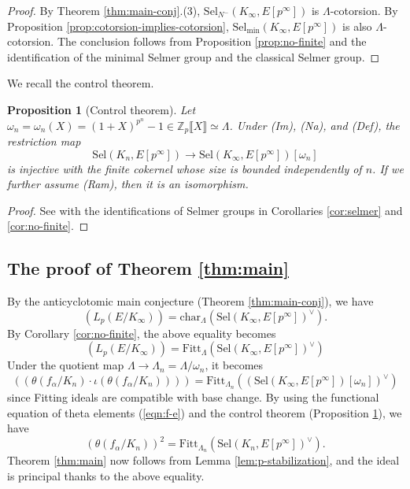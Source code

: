 \documentclass[11pt]{amsart}
\numberwithin{equation}{section}
\newtheorem{prop}[thm]{Proposition}
\theoremstyle{definition}
\begin{document}
\begin{proof}
By Theorem \ref{thm:main-conj}.(3), $\mathrm{Sel}_{N^-}(K_\infty, E[p^\infty])$ is $\Lambda$-cotorsion.
By Proposition \ref{prop:cotorsion-implies-cotorsion},  $\mathrm{Sel}_{\mathrm{min}}(K_\infty, E[p^\infty])$ is also $\Lambda$-cotorsion.
The conclusion follows from Proposition \ref{prop:no-finite} and the identification of the minimal Selmer group and the classical Selmer group.
\end{proof}
We recall the control theorem.
\begin{prop}[Control theorem] \label{prop:control}
Let $\omega_n = \omega_n(X) = (1+X)^{p^n} -1 \in \mathbb{Z}_p\llbracket X \rrbracket \simeq \Lambda$.  %
Under (Im), (Na), and (Def), the restriction map
$$\mathrm{Sel}(K_n, E[p^\infty]) \to \mathrm{Sel}(K_\infty, E[p^\infty])[\omega_n] $$
is injective with the finite cokernel whose size is bounded independently of $n$. If we further assume (Ram),
then it is an isomorphism.
\end{prop}
\begin{proof}
See \cite[Prop. 1.9]{chida-hsieh-main-conj} with the identifications of Selmer groups in Corollaries \ref{cor:selmer} and \ref{cor:no-finite}.
\end{proof}

\subsection{The proof of Theorem \ref{thm:main}}
By the anticyclotomic main conjecture (Theorem \ref{thm:main-conj}), we have
$$\left( L_p(E/K_\infty) \right) = \mathrm{char}_{\Lambda} \left( \mathrm{Sel}(K_\infty, E[p^\infty])^\vee \right) .$$
By Corollary \ref{cor:no-finite}, the above equality becomes
$$\left( L_p(E/K_\infty) \right) = \mathrm{Fitt}_{\Lambda} \left( \mathrm{Sel}(K_\infty, E[p^\infty])^\vee \right)$$
Under the quotient map $\Lambda \to \Lambda_n = \Lambda / \omega_n$, it becomes
$$\left( \left(  \theta(f_\alpha/K_n) \cdot \iota( \theta(f_\alpha/K_n) ) \right) \right) = \mathrm{Fitt}_{\Lambda_n} \left( \left( \mathrm{Sel}(K_\infty, E[p^\infty]) [\omega_n]\right)^\vee \right)$$
since Fitting ideals are compatible with base change.
By using the functional equation of theta elements (\ref{eqn:f-e}) and the control theorem (Proposition \ref{prop:control}), we have
$$\left(  \theta(f_\alpha/K_n)  \right)^2 = \mathrm{Fitt}_{\Lambda_n} \left(  \mathrm{Sel}(K_n, E[p^\infty])^\vee \right) .$$
Theorem \ref{thm:main} now follows from Lemma \ref{lem:p-stabilization}, and the ideal is principal thanks to the above equality.
\end{document}
